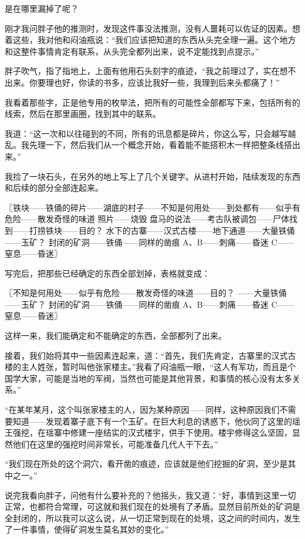 是在哪里漏掉了呢？

刚才我问胖子他的推测时，发现这件事没法推测，没有人噩耗可以佐证的因素。想着这些，我对他和闷油瓶说：“我们应该把知道的东西从头完全理一遍。这个地方和这整件事情肯定有联系，从头完全都列出来，说不定能找到点提示。”

胖子吹气，指了指地上，上面有他用石头刻字的痕迹，“我之前理过了，实在想不出来。你要理也好，你读的书多，应该比我好一些，我理到后来头都痛了！”

我看着那些字，正是他专用的枚举法，把所有的可能性全部都写下来，包括所有的线索，然后在那里画圈，找到其中的联系。

我道：“这一次和以往碰到的不同，所有的讯息都是碎片，你这么写，只会越写越乱。我先理一下，然后我们从一个概念开始，看着能不能搭积木一样把整条线搭出来。”

我捡了一块石头，在另外的地上写上了几个关键字。从进村开始，陆续发现的东西和后续的部分全部连起来。

〖铁块——铁俑的碎片——湖底的村子——不知是何用处——到处都有——似乎有危险——散发奇怪的味道
照片——烧毁
盘马的说法——考古队被调包——尸体找到——打捞铁块——目的？
水下的古寨——汉式古楼——地下通道——大量铁俑——玉矿？
封闭的矿洞——铁俑——同样的凿痕
A、B——刺痛——昏迷
C——窒息——昏迷〗

写完后，把那些已经确定的东西全部划掉，表格就变成：

〖不知是何用处——似乎有危险——散发奇怪的味道——目的？
——大量铁俑——玉矿？
封闭的矿洞——铁俑——同样的凿痕
A、B——刺痛——昏迷
C——窒息——昏迷〗

这样一来，我们能确定和不能确定的东西，全部都列了出来。

接着，我们始将其中一些因素连起来，道：“首先，我们先肯定，古寨里的汉式古楼的主人姓张，暂时叫他张家楼主。”我看了闷油瓶一眼，“这人有军功，而且是个国学大家，可能是当地的军阀，当然也可能是其他背景，和事情的核心没有太多关系。”

“在某年某月，这个叫张家楼主的人，因为某种原因——同样，这种原因我们不需要知道——发现着寨子底下有一个玉矿。在巨大利息的诱惑下，他伙同了这里的瑶王强挖，在瑶寨中修建一座结实的汉式楼宇，供手下使用。楼宇修得这么坚固，显然他们在这里的强挖时间非常长，可能准备几代人干下去。”

“我们现在所处的这个洞穴，看开凿的痕迹，应该就是他们挖掘的矿洞，至少是其中之一。”

说完我看向胖子，问他有什么要补充的？他摇头，我又道：“好，事情到这里一切正常，也都符合常理，可这就和我们现在的处境有了矛盾。显然目前所处的矿洞是全封闭的，所以我可以这么说，从一切正常到现在的处境，这之间的时间内，发生了一件事情，使得矿洞发生莫名其妙的变化。”


